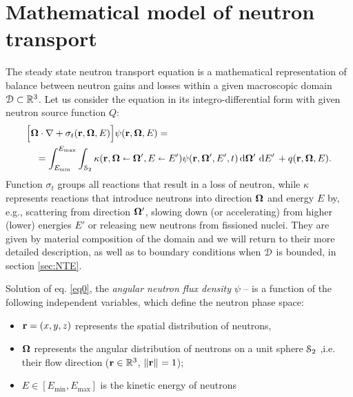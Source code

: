 \ifpdf
	\graphicspath{{2/pic/PNG/}{2/pic/PDF/}{2/pic/}}
\else
	\graphicspath{{2/pic/EPS/}{2/pic/}}
\fi

\chapter{Mathematical model of neutron transport}\label{chap:nte-review}


The steady state neutron transport equation is a mathematical representation of balance between neutron gains and losses
within a given macroscopic domain $\VV\subset\R[3]$\index{$\VV$}. Let us consider the equation in its
integro-differential form with given neutron source function $Q$:
\begin{equation}\label{eq0}
  \begin{multlined}
    \Bigl[
      \bomega\cdot\grad + \sigma_t(\br,\bomega,E)
    \Bigr]
    \psi(\br,\bomega,E) =\\
    = \intE[']{\Emin}{\Emax}{\intA[']{\kappa(\br,\bomega\sla\bomega',E\sla E')\psi(\br,\bomega',E',t)}}  + 
    \src(\br,\bomega,E).
  \end{multlined}  
\end{equation}
Function $\sigma_t$ groups all reactions that result in a loss of neutron, while
$\kappa$\index{$\kappa$} represents reactions that introduce neutrons into direction $\bomega$ and energy $E$ by, e.g.,
scattering from direction $\bomega'$, slowing down (or accelerating) from higher (lower) energies $E'$ or releasing new neutrons from fissioned nuclei.
They are given by material composition of the domain and we will return to their more detailed description, as
well as to boundary conditions when $\VV$ is bounded, in section \ref{sec:NTE}.

Solution of eq. \eqref{eq0}, the \textit{angular neutron flux density} $\psi$ -- is a function of the following
independent variables, which define the neutron phase space:
\begin{itemize}
 	\item $\br = (x,y,z)$	\index{$\br$}
 	 represents the spatial distribution of
 	 neutrons,
 	\item $\bomega$\index{$\bomega$} represents the
 	angular distribution of neutrons on a unit sphere $\Sphere$ ,i.e. their flow direction ($\br\in\R[3]$, $\norm{\br}=1$);
 	\item $E\in [E_{\text{min}},E_{\text{max}}]$ is the
 	kinetic energy of neutrons
\end{itemize}

